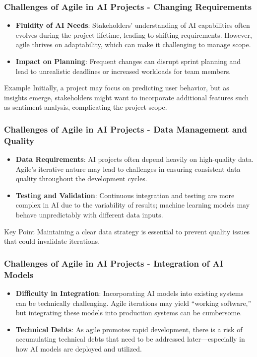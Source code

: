 \documentclass{beamer}
\begin{document}
\begin{frame}[fragile]
    \frametitle{Challenges of Agile in AI Projects - Changing Requirements}
    \begin{itemize}
        \item \textbf{Fluidity of AI Needs}: Stakeholders’ understanding of AI capabilities often evolves during the project lifetime, leading to shifting requirements. However, agile thrives on adaptability, which can make it challenging to manage scope.
        \item \textbf{Impact on Planning}: Frequent changes can disrupt sprint planning and lead to unrealistic deadlines or increased workloads for team members.
    \end{itemize}
    \begin{block}{Example}
        Initially, a project may focus on predicting user behavior, but as insights emerge, stakeholders might want to incorporate additional features such as sentiment analysis, complicating the project scope.
    \end{block}
\end{frame}

\begin{frame}[fragile]
    \frametitle{Challenges of Agile in AI Projects - Data Management and Quality}
    \begin{itemize}
        \item \textbf{Data Requirements}: AI projects often depend heavily on high-quality data. Agile's iterative nature may lead to challenges in ensuring consistent data quality throughout the development cycles.
        \item \textbf{Testing and Validation}: Continuous integration and testing are more complex in AI due to the variability of results; machine learning models may behave unpredictably with different data inputs.
    \end{itemize}
    \begin{block}{Key Point}
        Maintaining a clear data strategy is essential to prevent quality issues that could invalidate iterations.
    \end{block}
\end{frame}

\begin{frame}[fragile]
    \frametitle{Challenges of Agile in AI Projects - Integration of AI Models}
    \begin{itemize}
        \item \textbf{Difficulty in Integration}: Incorporating AI models into existing systems can be technically challenging. Agile iterations may yield “working software,” but integrating these models into production systems can be cumbersome.
        \item \textbf{Technical Debts}: As agile promotes rapid development, there is a risk of accumulating technical debts that need to be addressed later—especially in how AI models are deployed and utilized.
    \end{itemize}
\end{frame}
\end{document}
